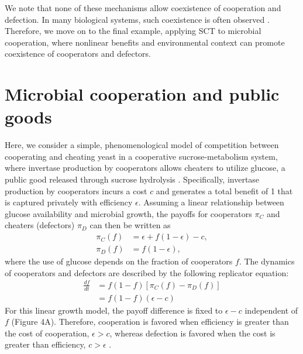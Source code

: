 \documentclass[12pt]{article}
\begin{document}
We note that none of these mechanisms allow coexistence of cooperation and defection.
In many biological systems, such coexistence is often observed \citep{gore2009snowdrift,cordero2012public,kocher2018genetic,pollak2021public,lin2024interspecific}.
Therefore, we move on to the final example, applying SCT to microbial cooperation, where nonlinear benefits and environmental context can promote coexistence of cooperators and defectors.

\section*{Microbial cooperation and public goods}

Here, we consider a simple, phenomenological model of competition between cooperating and cheating yeast in a cooperative sucrose-metabolism system, where invertase production by cooperators allows cheaters to utilize glucose, a public good released through sucrose hydrolysis \citep{carlson1982two,dickinson1998metabolism,gore2009snowdrift}. 
Specifically, invertase production by cooperators incurs a cost $c$ and generates a total benefit of 1 that is captured privately with efficiency $\epsilon$. 
Assuming a linear relationship between glucose availability and microbial growth, the payoffs for cooperators $\pi_C$ and cheaters (defectors) $\pi_D$ can then be written as
\begin{align}
\pi_C(f) &= \epsilon + f (1-\epsilon) - c,\\
\pi_D(f) &= f (1-\epsilon),
\end{align}
where the use of glucose depends on the fraction of cooperators $f$. 
The dynamics of cooperators and defectors are described by the following replicator equation:
\begin{align}
\frac{df}{dt} &= f(1-f)\left[\pi_C(f)-\pi_D(f)\right]\\
&= f(1-f)(\epsilon - c)
\end{align}
For this linear growth model, the payoff difference is fixed to $\epsilon-c$ independent of $f$ (Figure 4A).
Therefore, cooperation is favored when efficiency is greater than the cost of cooperation, $\epsilon > c$, whereas defection is favored when the cost is greater than efficiency, $c > \epsilon$ \citep{gore2009snowdrift}.
\end{document}
